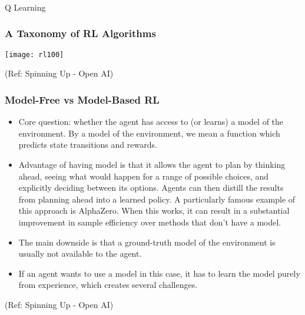 \begin{frame}[fragile]\frametitle{}
\begin{center}
{\Large Q Learning}
\end{center}
\end{frame}

\begin{frame}[fragile]\frametitle{A Taxonomy of RL Algorithms}

\begin{center}
\texttt{[image: rl100]}
\end{center}

{\tiny (Ref: Spinning Up - Open AI)}
\end{frame}

\begin{frame}[fragile]\frametitle{Model-Free vs Model-Based RL}

\begin{itemize}
\item Core question: whether the agent has access to (or learns) a model of the environment. By a model of the environment, we mean a function which predicts state transitions and rewards.
\item Advantage of having model is that it allows the agent to plan by thinking ahead, seeing what would happen for a range of possible choices, and explicitly deciding between its options. Agents can then distill the results from planning ahead into a learned policy. A particularly famous example of this approach is AlphaZero. When this works, it can result in a substantial improvement in sample efficiency over methods that don’t have a model.
\item The main downside is that a ground-truth model of the environment is usually not available to the agent. 
\item If an agent wants to use a model in this case, it has to learn the model purely from experience, which creates several challenges. 

\end{itemize}

{\tiny (Ref: Spinning Up - Open AI)}
\end{frame}

